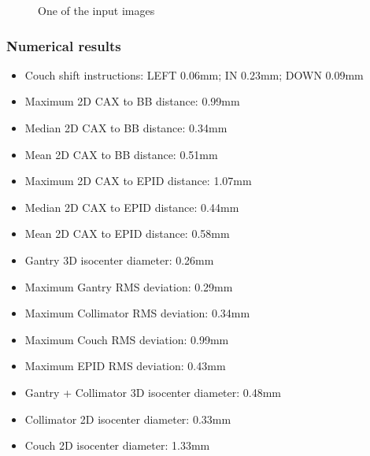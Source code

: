 \begin{figure}[H]
    \centering
    \caption{One of the input images}
\end{figure}

\subsubsection{Numerical results}

\begin{multicols}{2}
\begin{itemize}

    \item Couch shift instructions: LEFT 0.06mm; IN 0.23mm; DOWN 0.09mm
    \item Maximum 2D CAX to BB distance: 0.99mm
    \item Median 2D CAX to BB distance: 0.34mm
    \item Mean 2D CAX to BB distance: 0.51mm
    \item Maximum 2D CAX to EPID distance: 1.07mm
    \item Median 2D CAX to EPID distance: 0.44mm
    \item Mean 2D CAX to EPID distance: 0.58mm
    \item Gantry 3D isocenter diameter: 0.26mm
    \item Maximum Gantry RMS deviation: 0.29mm
    \item Maximum Collimator RMS deviation: 0.34mm
    \item Maximum Couch RMS deviation: 0.99mm
    \item Maximum EPID RMS deviation: 0.43mm
    \item Gantry + Collimator 3D isocenter diameter: 0.48mm
    \item Collimator 2D isocenter diameter: 0.33mm
    \item Couch 2D isocenter diameter: 1.33mm
    
\end{itemize}
\end{multicols}

